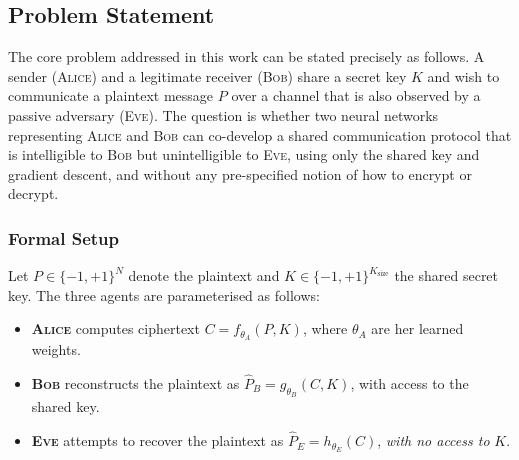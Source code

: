 \documentclass[12pt, a4paper]{article}
\newcommand{\alice}{\textsc{Alice}}
\newcommand{\bob}{\textsc{Bob}}
\newcommand{\eve}{\textsc{Eve}}
\newcommand{\thetaA}{\theta_{\!A}}
\newcommand{\thetaB}{\theta_{\!B}}
\newcommand{\thetaE}{\theta_{\!E}}
\begin{document}
\subsection{Problem Statement}
\label{subsec:problem}

The core problem addressed in this work can be stated precisely as follows.
A sender (\alice{}) and a legitimate receiver (\bob{}) share a secret key
$K$ and wish to communicate a plaintext message $P$ over a channel that is
also observed by a passive adversary (\eve{}). The question is whether two
neural networks representing \alice{} and \bob{} can co-develop a shared
communication protocol that is intelligible to \bob{} but unintelligible
to \eve{}, using only the shared key and gradient descent, and without any
pre-specified notion of how to encrypt or decrypt.

\subsubsection*{Formal Setup}

Let $P \in \{-1,+1\}^N$ denote the plaintext and
$K \in \{-1,+1\}^{K_{\text{size}}}$ the shared secret key.
The three agents are parameterised as follows:

\begin{itemize}[leftmargin=1.8em, itemsep=3pt]
  \item \textbf{\alice{}} computes ciphertext
        $C = f_{\thetaA}(P, K)$, where $\thetaA$ are her learned weights.
  \item \textbf{\bob{}} reconstructs the plaintext as
        $\hat{P}_B = g_{\thetaB}(C, K)$, with access to the shared key.
  \item \textbf{\eve{}} attempts to recover the plaintext as
        $\hat{P}_E = h_{\thetaE}(C)$, \emph{with no access to} $K$.
\end{itemize}
\end{document}
